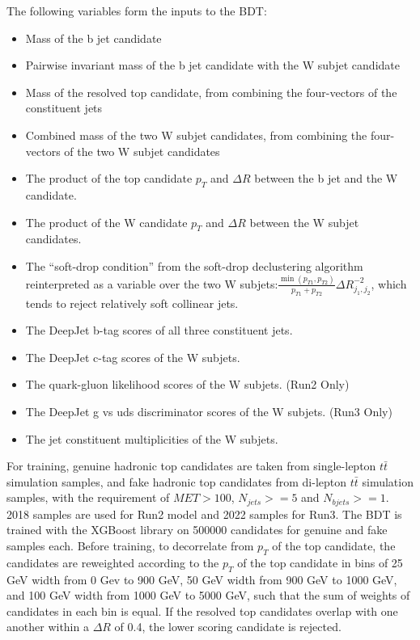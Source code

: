 \documentclass[twoside]{article}
\begin{document}
The following variables form the inputs to the BDT:

\begin{itemize}
  \item Mass of the b jet candidate
  \item Pairwise invariant mass of the b jet candidate with the W subjet candidate
  \item Mass of the resolved top candidate, from combining the four-vectors of the constituent jets
  \item Combined mass of the two W subjet candidates, from combining the four-vectors of the two W subjet candidates
  \item The product of the top candidate $p_{T}$ and $\Delta R$ between the b jet and the W candidate.
  \item The product of the W candidate $p_{T}$ and $\Delta R$ between the W subjet candidates.
  \item The ``soft-drop condition'' from the soft-drop declustering algorithm reinterpreted as a variable over the two W subjets:$\frac{\min(p_{T1}, p_{T2})}{p_{T1} + p_{T2}} \Delta R_{j_1, j_2}^{-2}$, which tends to reject relatively soft collinear jets.
  \item The DeepJet b-tag scores of all three constituent jets.
  \item The DeepJet c-tag scores of the W subjets. %
  \item The quark-gluon likelihood scores of the W subjets. (Run2 Only)
  \item The DeepJet g vs uds discriminator scores of the W subjets. (Run3 Only)
  \item The jet constituent multiplicities of the W subjets.
\end{itemize}

For training, genuine hadronic top candidates are taken from single-lepton $t\bar{t}$ simulation samples, and fake hadronic top candidates from di-lepton $t\bar{t}$ simulation samples, with the requirement of $MET>100$,  $N_{jets}>=5$ and $N_{bjets}>=1$. 2018 samples are used for Run2 model and 2022 samples for Run3. The BDT is trained with the XGBoost library on 500000 candidates for genuine and fake samples each. Before training, to decorrelate from $p_{T}$ of the top candidate, the candidates are reweighted according to the $p_{T}$ of the top candidate in bins of 25 GeV width from 0 Gev to 900 GeV, 50 GeV width from 900 GeV to 1000 GeV, and 100 GeV width from 1000 GeV to 5000 GeV, such that the sum of weights of candidates in each bin is equal. If the resolved top candidates overlap with one another within a $\Delta R$ of 0.4, the lower scoring candidate is rejected.
\end{document}
